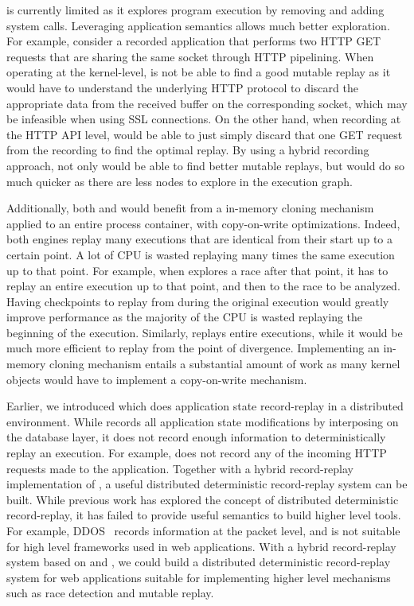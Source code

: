 \dora is currently limited as it explores program execution
by removing and adding system calls. Leveraging application semantics allows
much better exploration. For example, consider a recorded application that
performs two HTTP GET requests that are sharing the same socket through HTTP
pipelining. When operating at the kernel-level, \dora is not be able to
find a good mutable replay as it would have to understand the underlying HTTP
protocol to discard the appropriate data from the received buffer on the
corresponding socket, which may be infeasible when using SSL connections.
On the other hand, when recording at the HTTP API level, \dora would be able to
just simply discard that one GET request from the recording to find the optimal
replay. By using a hybrid recording approach, \dora not only would be able to
find better mutable replays, but would do so much quicker as there are
less nodes to explore in the execution graph.

Additionally, both \racepro and \dora would benefit from a in-memory cloning
mechanism applied to an entire process container, with copy-on-write optimizations.
Indeed, both engines replay many executions that are identical from their start
up to a certain point. A lot of CPU is wasted replaying many times the same
execution up to that point. For example, when \racepro explores a race after
that point, it has to replay an entire execution up to that point, and then to
the race to be analyzed. Having checkpoints to replay from during the original
execution would greatly improve performance as the majority of the CPU is wasted
replaying the beginning of the execution. Similarly, \dora replays entire
executions, while it would be much more efficient to replay from the point of
divergence. Implementing an in-memory cloning mechanism entails a substantial
amount of work as many kernel objects would have to implement a copy-on-write
mechanism.

Earlier, we introduced \synapse which does application state record-replay in a
distributed environment.
While \synapse records all application state modifications by
interposing on the database layer, it does not record enough
information to deterministically replay an execution. For example, \synapse does
not record any of the incoming HTTP requests made to the application.  Together
with a hybrid record-replay implementation of \scribe, a useful distributed
deterministic record-replay system can be built.  While previous work has
explored the concept of distributed deterministic record-replay, it has failed
to provide useful semantics to build higher level tools. For example,
DDOS~\cite{ddos} records information at the packet level, and is not suitable
for high level frameworks used in web applications.  With a hybrid record-replay
system based on \scribe and \synapse, we could build a distributed deterministic
record-replay system for web applications suitable for implementing higher level
mechanisms such as race detection and mutable replay.

